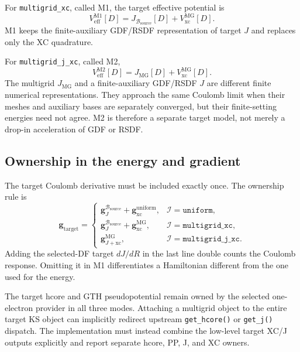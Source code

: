 For \texttt{multigrid\_xc}, called M1, the target effective potential is
\begin{equation}
  V_{\mathrm{eff}}^{\mathrm{M1}}[D]
  =J_{\mathcal B_{\mathrm{source}}}[D]
   +V_{\mathrm{xc}}^{\mathrm{MG}}[D].
  \label{eq:target-m1-veff}
\end{equation}
M1 keeps the finite-auxiliary GDF/RSDF representation of target $J$ and
replaces only the XC quadrature.

For \texttt{multigrid\_j\_xc}, called M2,
\begin{equation}
  V_{\mathrm{eff}}^{\mathrm{M2}}[D]
  =J_{\mathrm{MG}}[D]+V_{\mathrm{xc}}^{\mathrm{MG}}[D].
  \label{eq:target-m2-veff}
\end{equation}
The multigrid $J_{\mathrm{MG}}$ and a finite-auxiliary GDF/RSDF $J$ are
different finite numerical representations.  They approach the same Coulomb
limit when their meshes and auxiliary bases are separately converged, but
their finite-setting energies need not agree.  M2 is therefore a separate
target model, not merely a drop-in acceleration of GDF or RSDF.

\subsection{Ownership in the energy and gradient}

The target Coulomb derivative must be included exactly once.  The ownership
rule is
\begin{equation}
  \mathbf g_{\mathrm{target}}
  =\begin{cases}
    \mathbf g_J^{\mathcal B_{\mathrm{source}}}
    +\mathbf g_{\mathrm{xc}}^{\mathrm{uniform}},
      &\mathcal I=\texttt{uniform},\\
    \mathbf g_J^{\mathcal B_{\mathrm{source}}}
    +\mathbf g_{\mathrm{xc}}^{\mathrm{MG}},
      &\mathcal I=\texttt{multigrid\_xc},\\
    \mathbf g_{J+\mathrm{xc}}^{\mathrm{MG}},
      &\mathcal I=\texttt{multigrid\_j\_xc}.
  \end{cases}
  \label{eq:target-gradient-owner}
\end{equation}
Adding the selected-DF target $dJ/dR$ in the last line double counts the
Coulomb response.  Omitting it in M1 differentiates a Hamiltonian different
from the one used for the energy.

The target hcore and GTH pseudopotential remain owned by the selected
one-electron provider in all three modes.  Attaching a multigrid object to the
entire target KS object can implicitly redirect upstream \texttt{get\_hcore()}
or \texttt{get\_j()} dispatch.  The implementation must instead combine the
low-level target XC/J outputs explicitly and report separate hcore, PP, J,
and XC owners.

